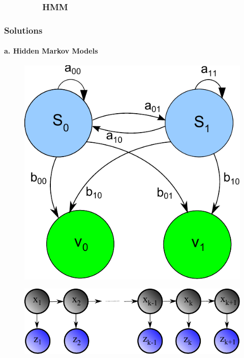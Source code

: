 \subsubsection{\ \ \ \ \ \ \ \ HMM }
\begin{frame}
\frametitle{Solutions}
\framesubtitle{a. Hidden Markov Models}
\mypagenum
\begin{figure}
\includegraphics[height=0.3\textheight]{figs/HMM_flowDiagram.pdf}
\end{figure}
\begin{figure}
\includegraphics[width=1.0\textwidth]{figs/HMM_flowDiagram2.pdf}
\end{figure}
\end{frame}



